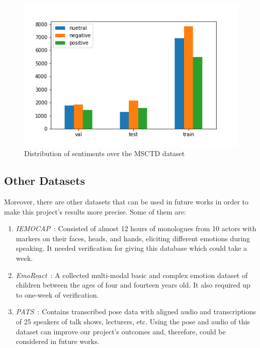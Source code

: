 \begin{figure}[t]
	\centering
	\includegraphics[width=\linewidth]{fig/MSCTDhist}
	\caption{Distribution of sentiments over the MSCTD dataset}
	\label{fig:MSCTDhist}
\end{figure}


\subsection{Other Datasets}
Moreover, there are other datasets that can be used in future works in order to make this project's results more precise. Some of them are:

\begin{enumerate}
	\item \emph{IEMOCAP~\cite{busso2008iemocap}}: Consisted of almost 12 hours of monologues from 10 actors with markers on their faces, heads, and hands, eliciting different emotions during speaking. It needed verification for giving this database which could take a week.
	\item \emph{EmoReact~\cite{nojavanasghari2016emoreact}}: A collected multi-modal basic and complex emotion dataset of children between the ages of four and fourteen years old. It also required up to one-week of verification.
	\item \emph{PATS~\cite{ahuja2020no,ahuja2020style,ginosar2019learning}}: Contains transcribed pose data with aligned audio and transcriptions of 25 speakers of talk shows, lecturers, etc. Using the pose and audio of this dataset can improve our project's outcomes and, therefore, could be considered in future works.
\end{enumerate}

